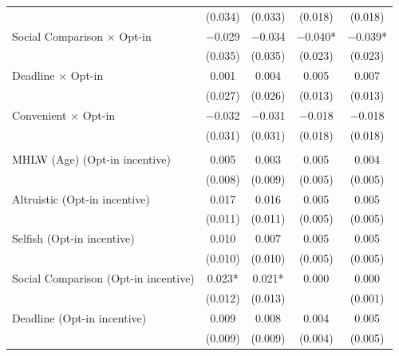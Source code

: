 \documentclass[
  11pt,
  a4paper
]{article}
\begin{document}
\begin{table}
\begin{threeparttable}
\begin{tabular}[t]{lcccc}
 & (\num{0.034}) & (\num{0.033}) & (\num{0.018}) & (\num{0.018})\\
Social Comparison $\times$ Opt-in & \num{-0.029} & \num{-0.034} & \num{-0.040}* & \num{-0.039}*\\
 & (\num{0.035}) & (\num{0.035}) & (\num{0.023}) & (\num{0.023})\\
Deadline $\times$ Opt-in & \num{0.001} & \num{0.004} & \num{0.005} & \num{0.007}\\
 & (\num{0.027}) & (\num{0.026}) & (\num{0.013}) & (\num{0.013})\\
Convenient $\times$ Opt-in & \num{-0.032} & \num{-0.031} & \num{-0.018} & \num{-0.018}\\
 & (\num{0.031}) & (\num{0.031}) & (\num{0.018}) & (\num{0.018})\\
\addlinespace[0.3em]
\multicolumn{5}{l}{\textbf{Linear combination test: Treatment + Opt-in $\times$ Treatment}}\\
\hspace{1em}MHLW (Age) (Opt-in incentive) & \num{0.005} & \num{0.003} & \num{0.005} & \num{0.004}\\
\hspace{1em} & (\num{0.008}) & (\num{0.009}) & (\num{0.005}) & (\num{0.005})\\
\hspace{1em}Altruistic (Opt-in incentive) & \num{0.017} & \num{0.016} & \num{0.005} & \num{0.005}\\
\hspace{1em} & (\num{0.011}) & (\num{0.011}) & (\num{0.005}) & (\num{0.005})\\
\hspace{1em}Selfish (Opt-in incentive) & \num{0.010} & \num{0.007} & \num{0.005} & \num{0.005}\\
\hspace{1em} & (\num{0.010}) & (\num{0.010}) & (\num{0.005}) & (\num{0.005})\\
\hspace{1em}Social Comparison (Opt-in incentive) & \num{0.023}* & \num{0.021}* & \num{0.000} & \num{0.000}\\
\hspace{1em} & (\num{0.012}) & (\num{0.013}) &  & (\num{0.001})\\
\hspace{1em}Deadline (Opt-in incentive) & \num{0.009} & \num{0.008} & \num{0.004} & \num{0.005}\\
\hspace{1em} & (\num{0.009}) & (\num{0.009}) & (\num{0.004}) & (\num{0.005})\\

\end{tabular}
\end{threeparttable}
\end{table}
\end{document}
